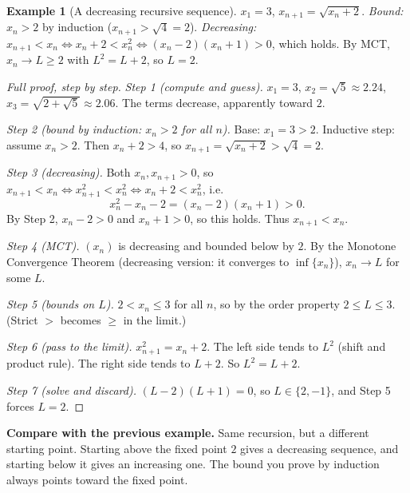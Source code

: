 \documentclass[11pt]{article}
\theoremstyle{definition}
\newtheorem{ex}[defn]{Example}
\newcommand{\key}[1]{\textcolor{red!70!black}{\textbf{#1}}}
\begin{document}
\begin{ex}[A decreasing recursive sequence]
$x_1=3$, $x_{n+1}=\sqrt{x_n+2}$. \emph{Bound:} $x_n>2$ by induction
($x_{n+1}>\sqrt4=2$). \emph{Decreasing:}
$x_{n+1}<x_n\iff x_n+2<x_n^2\iff(x_n-2)(x_n+1)>0$, which holds. By MCT,
$x_n\to L\ge2$ with $L^2=L+2$, so $L=2$.

\begin{proof}[Full proof, step by step]
\emph{Step 1 (compute and guess).} $x_1=3$, $x_2=\sqrt5\approx2.24$,
$x_3=\sqrt{2+\sqrt5}\approx2.06$. The terms decrease, apparently toward $2$.

\emph{Step 2 (bound by induction: $x_n>2$ for all $n$).} Base: $x_1=3>2$.
Inductive step: assume $x_n>2$. Then $x_n+2>4$, so
$x_{n+1}=\sqrt{x_n+2}>\sqrt4=2$.

\emph{Step 3 (decreasing).} Both $x_n,x_{n+1}>0$, so
$x_{n+1}<x_n\iff x_{n+1}^2<x_n^2\iff x_n+2<x_n^2$, i.e.\
\[
x_n^2-x_n-2=(x_n-2)(x_n+1)>0.
\]
By Step 2, $x_n-2>0$ and $x_n+1>0$, so this holds. Thus $x_{n+1}<x_n$.

\emph{Step 4 (MCT).} $(x_n)$ is decreasing and bounded below by $2$. By
the Monotone Convergence Theorem (decreasing version: it converges to
$\inf\{x_n\}$), $x_n\to L$ for some $L$.

\emph{Step 5 (bounds on $L$).} $2<x_n\le3$ for all $n$, so by the order
property $2\le L\le3$. (Strict $>$ becomes $\ge$ in the limit.)

\emph{Step 6 (pass to the limit).} $x_{n+1}^2=x_n+2$. The left side tends
to $L^2$ (shift and product rule). The right side tends to $L+2$. So
$L^2=L+2$.

\emph{Step 7 (solve and discard).} $(L-2)(L+1)=0$, so $L\in\{2,-1\}$, and
Step 5 forces $L=2$.
\end{proof}
\noindent\key{Compare with the previous example.} Same recursion, but a
different starting point. Starting above the fixed point $2$ gives a
decreasing sequence, and starting below it gives an increasing one. The
bound you prove by induction always points toward the fixed point.
\end{ex}
\end{document}
